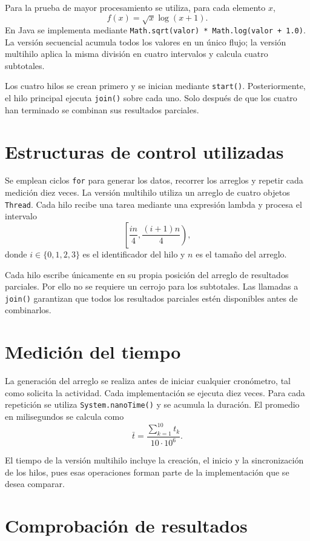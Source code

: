 \documentclass[12pt,oneside]{template/liverpoolthesis}
\begin{document}
Para la prueba de mayor procesamiento se utiliza, para cada elemento \(x\),
\[
f(x)=\sqrt{x}\log(x+1).
\]
En Java se implementa mediante
\texttt{Math.sqrt(valor) * Math.log(valor + 1.0)}. La versión secuencial
acumula todos los valores en un único flujo; la versión multihilo aplica la
misma división en cuatro intervalos y calcula cuatro subtotales.

Los cuatro hilos se crean primero y se inician mediante \texttt{start()}.
Posteriormente, el hilo principal ejecuta \texttt{join()} sobre cada uno.
Solo después de que los cuatro han terminado se combinan sus resultados
parciales.

\section{Estructuras de control utilizadas}

Se emplean ciclos \texttt{for} para generar los datos, recorrer los arreglos y
repetir cada medición diez veces. La versión multihilo utiliza un arreglo de
cuatro objetos \texttt{Thread}. Cada hilo recibe una tarea mediante una
expresión lambda y procesa el intervalo
\[
\left[
\frac{i n}{4},
\frac{(i+1)n}{4}
\right),
\]
donde \(i\in\{0,1,2,3\}\) es el identificador del hilo y \(n\) es el tamaño del
arreglo.

Cada hilo escribe únicamente en su propia posición del arreglo de resultados
parciales. Por ello no se requiere un cerrojo para los subtotales. Las llamadas
a \texttt{join()} garantizan que todos los resultados parciales estén
disponibles antes de combinarlos.

\section{Medición del tiempo}

La generación del arreglo se realiza antes de iniciar cualquier cronómetro, tal
como solicita la actividad. Cada implementación se ejecuta diez veces. Para
cada repetición se utiliza \texttt{System.nanoTime()} y se acumula la duración.
El promedio en milisegundos se calcula como
\[
\bar t =
\frac{\sum_{k=1}^{10} t_k}{10\cdot 10^6}.
\]

El tiempo de la versión multihilo incluye la creación, el inicio y la
sincronización de los hilos, pues esas operaciones forman parte de la
implementación que se desea comparar.

\section{Comprobación de resultados}
\end{document}
